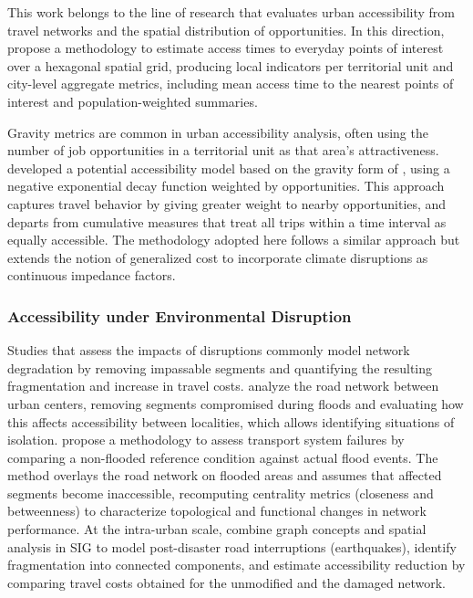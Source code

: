 This work belongs to the line of research that evaluates urban accessibility from travel networks and the spatial distribution of opportunities. In this direction, \cite{Bruno2024} propose a methodology to estimate access times to everyday points of interest over a hexagonal spatial grid, producing local indicators per territorial unit and city-level aggregate metrics, including mean access time to the nearest points of interest and population-weighted summaries.

Gravity metrics are common in urban accessibility analysis, often using the number of job opportunities in a territorial unit as that area's attractiveness. \cite{PRITCHARD2019386} developed a potential accessibility model based on the gravity form of \cite{Hansen1959}, using a negative exponential decay function weighted by opportunities. This approach captures travel behavior by giving greater weight to nearby opportunities, and departs from cumulative measures that treat all trips within a time interval as equally accessible. The methodology adopted here follows a similar approach but extends the notion of generalized cost to incorporate climate disruptions as continuous impedance factors.

\subsubsection{Accessibility under Environmental Disruption}

Studies that assess the impacts of disruptions commonly model network degradation by removing impassable segments and quantifying the resulting fragmentation and increase in travel costs. \cite{Loreti2022} analyze the road network between urban centers, removing segments compromised during floods and evaluating how this affects accessibility between localities, which allows identifying situations of isolation. \cite{Abenayake2022An} propose a methodology to assess transport system failures by comparing a non-flooded reference condition against actual flood events. The method overlays the road network on flooded areas and assumes that affected segments become inaccessible, recomputing centrality metrics (closeness and betweenness) to characterize topological and functional changes in network performance. At the intra-urban scale, \cite{Bono2011A} combine graph concepts and spatial analysis in \ac{SIG} to model post-disaster road interruptions (earthquakes), identify fragmentation into connected components, and estimate accessibility reduction by comparing travel costs obtained for the unmodified and the damaged network.

